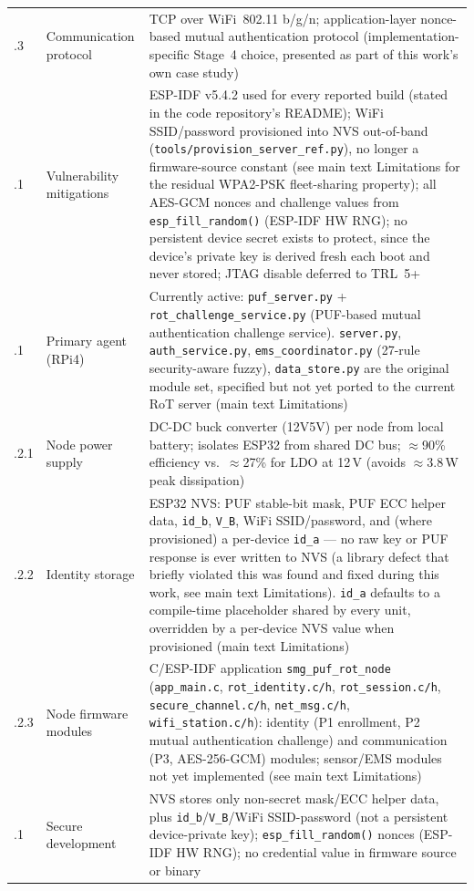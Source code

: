 \documentclass[12pt]{article}
\begin{document}
\begin{longtable}{
        >{\centering\arraybackslash}p{1.3cm}
        >{\raggedright\arraybackslash}p{3.7cm}
        >{\raggedright\arraybackslash}p{10.0cm}
    }
        4.1.3   & Communication protocol & TCP over WiFi~802.11 b/g/n; application-layer nonce-based mutual authentication protocol (implementation-specific Stage~4 choice, presented as part of this work's own case study) \\
        4.2.1   & Vulnerability mitigations & ESP-IDF v5.4.2 used for every reported build (stated in the code repository's README); WiFi SSID/password provisioned into NVS out-of-band (\texttt{tools/provision\_server\_ref.py}), no longer a firmware-source constant (see main text Limitations for the residual WPA2-PSK fleet-sharing property); all AES-GCM nonces and challenge values from \texttt{esp\_fill\_random()} (ESP-IDF HW RNG); no persistent device secret exists to protect, since the device's private key is derived fresh each boot and never stored; JTAG disable deferred to TRL~5+ \\
        5.1.1   & Primary agent (RPi4) & Currently active: \texttt{puf\_server.py} + \texttt{rot\_challenge\_service.py} (PUF-based mutual authentication challenge service). \texttt{server.py}, \texttt{auth\_service.py}, \texttt{ems\_coordinator.py} (27-rule security-aware fuzzy), \texttt{data\_store.py} are the original module set, specified but not yet ported to the current RoT server (main text Limitations) \\
        5.1.2.1   & Node power supply & DC-DC buck converter (12V\textrightarrow{}5V) per node from local battery; isolates ESP32 from shared DC bus; $\approx$90\% efficiency vs.\ $\approx$27\% for LDO at 12\,V (avoids $\approx$3.8\,W peak dissipation) \\
        5.1.2.2   & Identity storage & ESP32 NVS: PUF stable-bit mask, PUF ECC helper data, \texttt{id\_b}, \texttt{V\_B}, WiFi SSID/password, and (where provisioned) a per-device \texttt{id\_a} --- no raw key or PUF response is ever written to NVS (a library defect that briefly violated this was found and fixed during this work, see main text Limitations). \texttt{id\_a} defaults to a compile-time placeholder shared by every unit, overridden by a per-device NVS value when provisioned (main text Limitations) \\
        5.1.2.3   & Node firmware modules & C/ESP-IDF application \texttt{smg\_puf\_rot\_node} (\texttt{app\_main.c}, \texttt{rot\_identity.c/h}, \texttt{rot\_session.c/h}, \texttt{secure\_channel.c/h}, \texttt{net\_msg.c/h}, \texttt{wifi\_station.c/h}): identity (P1 enrollment, P2 mutual authentication challenge) and communication (P3, AES-256-GCM) modules; sensor/EMS modules not yet implemented (see main text Limitations) \\
        5.2.1   & Secure development & NVS stores only non-secret mask/ECC helper data, plus \texttt{id\_b}/\texttt{V\_B}/WiFi SSID-password (not a persistent device-private key); \texttt{esp\_fill\_random()} nonces (ESP-IDF HW RNG); no credential value in firmware source or binary \\
    \end{longtable}
    \endgroup
\end{document}
